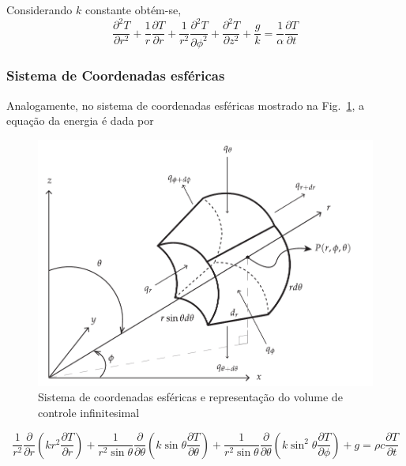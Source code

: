 Considerando $k$ constante obtém-se,
\begin{equation}\label{eq3Dcilb}
	\frac{\partial ^2T}{\partial r^2} + 
	\frac{1}{r} \frac{\partial T}{\partial r} + 
	\frac{1}{r^2} \frac{ \partial ^2T} {\partial \phi ^2} +
	\frac{\partial ^2T}{\partial z^2} + \frac{g}{k} = 
	\frac{1}{\alpha} \frac{\partial T}{\partial t}  
\end{equation}	
	
\subsubsection{Sistema de Coordenadas esféricas}
	
Analogamente, no sistema de coordenadas esféricas mostrado na Fig.~\ref{fig:coordEsfericas}, a equação da energia é dada por
\begin{figure}[ht]
	\centering
	\includegraphics[scale=.9]{figuras/cap1/coordenadasEsfericas.pdf}
	\caption{Sistema de coordenadas esféricas e representação do volume de controle infinitesimal }
	\label{fig:coordEsfericas}
\end{figure} 

\begin{equation}\label{eq3Desfa}
	\frac{1}{r^2} \frac{\partial}{\partial r} 
	\left(kr^2\frac{\partial T}{\partial r}\right) +
	\frac{1}{r^2\sin\theta} \frac{\partial}{\partial\theta} 
	\left(k\sin\theta\frac{\partial T}{\partial\theta}\right) +
	\frac{1}{r^2\sin\theta} \frac{\partial}{\partial\theta} 
	\left(k\sin^2\theta\frac{\partial T}{\partial\phi}\right) + 
	g = \rho c \frac{\partial T}{\partial t}  
\end{equation}	

